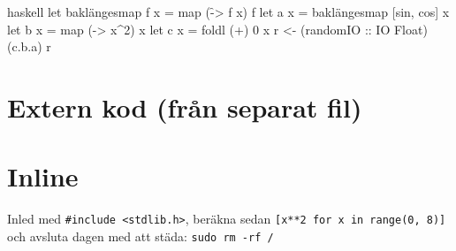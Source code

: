\documentclass[a4paper, article, oneside, leqno]{memoir}
\begin{document}
\begin{internallisting}{haskell}
  let baklängesmap f x = map (\f -> f x) f
  let a x = baklängesmap [sin, cos] x
  let b x = map (\x -> x^2) x
  let c x = foldl (+) 0 x
  r <- (randomIO :: IO Float)
  (c.b.a) r
\end{internallisting}

\section{Extern kod (från separat fil)}


\section{Inline}

Inled med \texttt{#include <stdlib.h>}, beräkna sedan \texttt{[x**2 for x in range(0, 8)]} och avsluta dagen med att städa: \texttt{sudo rm -rf /}
\end{document}
